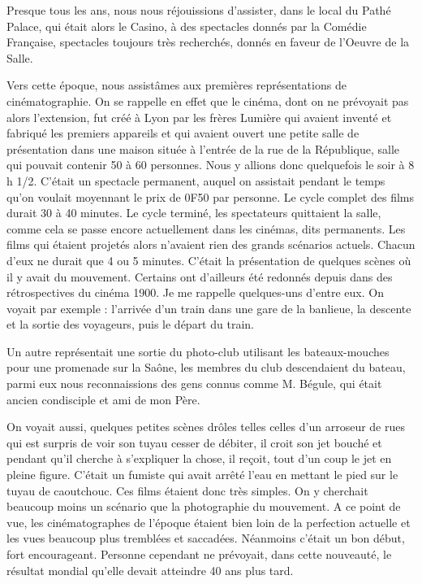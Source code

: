 \documentclass[11pt,a4paper]{report}
\begin{document}
Presque tous les ans, nous nous réjouissions d'assister, dans le local du Pathé Palace, qui était alors le Casino, à des spectacles donnés par la Comédie Française, spectacles toujours très recherchés, donnés en faveur de l'Oeuvre de la Salle.

Vers cette époque, nous assistâmes aux premières représentations de cinématographie. On se rappelle en effet que le cinéma, dont on ne prévoyait pas alors l'extension, fut créé à Lyon par les frères Lumière qui avaient inventé et fabriqué les premiers appareils et qui avaient ouvert une petite salle de présentation dans une maison située à l'entrée de la rue de la République, salle qui pouvait contenir 50 à 60 personnes. Nous y allions donc quelquefois le soir à 8 h 1/2. C'était un spectacle permanent, auquel on assistait pendant le temps qu'on voulait moyennant le prix de 0F50 par personne. Le cycle complet des films durait 30 à 40 minutes. Le cycle terminé, les spectateurs quittaient la salle, comme cela se passe encore actuellement dans les cinémas, dits permanents. Les films qui étaient projetés alors n'avaient rien des grands scénarios actuels. Chacun d'eux ne durait que 4 ou 5 minutes. C'était la présentation de quelques scènes où il y avait du mouvement. Certains ont d'ailleurs été redonnés depuis dans des rétrospectives du cinéma 1900. Je me rappelle quelques-uns d'entre eux. On voyait par exemple : l'arrivée d'un train dans une gare de la banlieue, la descente et la sortie des voyageurs, puis le départ du train.

Un autre représentait une sortie du photo-club utilisant les bateaux-mouches pour une promenade sur la Saône, les membres du club descendaient du bateau, parmi eux nous reconnaissions des gens connus comme M. Bégule, qui était ancien condisciple et ami de mon Père.

On voyait aussi, quelques petites scènes drôles telles celles d'un arroseur de rues qui est surpris de voir son tuyau cesser de débiter, il croit son jet bouché et pendant qu'il cherche à s'expliquer la chose, il reçoit, tout d'un coup le jet en pleine figure. C'était un fumiste qui avait arrêté l'eau en mettant le pied sur le tuyau de caoutchouc. Ces films étaient donc très simples. On y cherchait beaucoup moins un scénario que la photographie du mouvement. A ce point de vue, les cinématographes de l'époque étaient bien loin de la perfection actuelle et les vues beaucoup plus tremblées et saccadées. Néanmoins c'était un bon début, fort encourageant. Personne cependant ne prévoyait, dans cette nouveauté, le résultat mondial qu'elle devait atteindre 40 ans plus tard.
\end{document}
